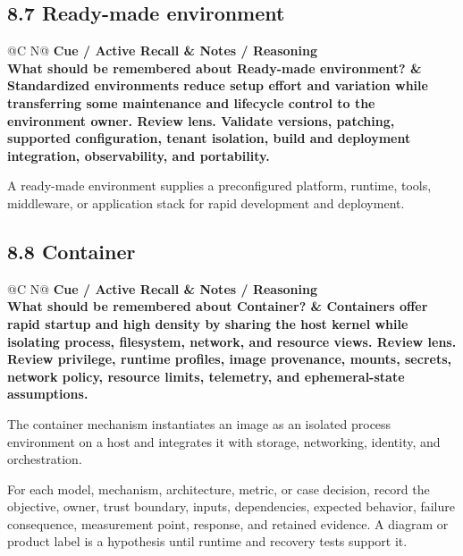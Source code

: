 \documentclass[11pt]{article}
\newcommand{\CornellHeader}{\rowcolor{Navy}\color{white}\bfseries Cue / Active Recall & \color{white}\bfseries Notes / Reasoning \\\endhead}
\newcommand{\CornellRow}[2]{\cellcolor{CueGray}\textbf{#1} & #2 \\\addlinespace[3pt]}
\begin{document}
\subsection{8.7 Ready-made environment}
\begin{longtable}{@{}C N@{}}
\CornellHeader
\CornellRow{What should be remembered about Ready-made environment?}{Standardized environments reduce setup effort and variation while transferring some maintenance and lifecycle control to the environment owner. \textbf{Review lens.} Validate versions, patching, supported configuration, tenant isolation, build and deployment integration, observability, and portability.}
\end{longtable}
\begin{sectionsummarybox}
A ready-made environment supplies a preconfigured platform, runtime, tools, middleware, or application stack for rapid development and deployment.
\end{sectionsummarybox}
\subsection{8.8 Container}
\begin{longtable}{@{}C N@{}}
\CornellHeader
\CornellRow{What should be remembered about Container?}{Containers offer rapid startup and high density by sharing the host kernel while isolating process, filesystem, network, and resource views. \textbf{Review lens.} Review privilege, runtime profiles, image provenance, mounts, secrets, network policy, resource limits, telemetry, and ephemeral-state assumptions.}
\end{longtable}
\begin{sectionsummarybox}
The container mechanism instantiates an image as an isolated process environment on a host and integrates it with storage, networking, identity, and orchestration.
\end{sectionsummarybox}
\begin{practicebox}
For each model, mechanism, architecture, metric, or case decision, record the objective, owner, trust boundary, inputs, dependencies, expected behavior, failure consequence, measurement point, response, and retained evidence. A diagram or product label is a hypothesis until runtime and recovery tests support it.
\end{practicebox}
\end{document}
